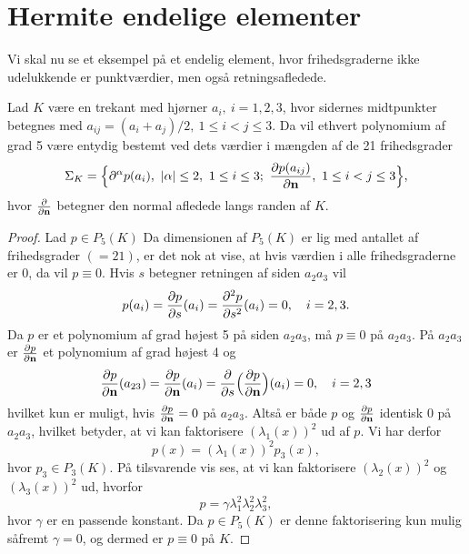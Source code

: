 \section{Hermite endelige elementer}
Vi skal nu se et eksempel på et endelig element, hvor frihedsgraderne
ikke udelukkende er punktværdier, men også retningsafledede.

\begin{theorem} \label{sec:arg} \label{argee}
Lad $K$ være en trekant med hjørner $a_i, \ i=1,2,3$, hvor sidernes 
midtpunkter betegnes med $a_{ij}=(a_i+a_j)/2, \ 1\leq i<j\leq 3$.
Da vil ethvert polynomium af grad 5 være entydig bestemt ved dets 
værdier i mængden af de 21 frihedsgrader 
\begin{equation} 
\Sigma_K = \Bigl\{ \partial^{\alpha}p(a_i), \ |\alpha| \leq 2, \ 1\leq i\leq 3; \ 
\afl{p(a_{ij})}{\n} ,\ 1\leq i<j\leq 3 \Bigr\}, 
\end{equation}
hvor $\frac{\partial }{\partial \mathbf{n}}$ betegner den normal afledede langs randen af $K$. 
\end{theorem}
\begin{proof}
Lad $p\in P_5(K)$
Da dimensionen af $P_5(K)$ er lig med antallet af frihedsgrader $(=21)$, er 
det nok at vise, at hvis værdien i alle frihedsgraderne er 0, da vil
$p\equiv 0$. Hvis $s$ betegner retningen af siden $a_2a_3$ vil
\begin{equation} \label{sec:arg1}
  p(a_i) = \frac{\partial p}{\partial s}(a_i) = \frac{\partial^2 p}{\partial s^2}(a_i)
  =0, \quad i=2,3. 
\end{equation}
Da $p$ er et polynomium af grad højest 5 på siden $a_2a_3$, må
$p\equiv 0$ på
$a_2a_3$. På $a_2a_3$ er $\frac{\partial p}{\partial \mathbf{n}}$ et polynomium af grad højest 4 og
\begin{equation} \label{sec:arg2}
  \frac{\partial p}{\partial \mathbf{n}}(a_{23})=\frac{\partial p}{\partial \mathbf{n}}(a_i)=
  \frac{\partial}{\partial s}\Bigl(\frac{\partial p}{\partial \mathbf{n}}\Bigr)(a_i)=0, \quad i=2,3 
\end{equation}
hvilket kun er muligt, hvis $\frac{\partial p}{\partial \mathbf{n}}=0$ på $a_2a_3$. Altså er både
$p$ og $\frac{\partial p}{\partial \mathbf{n}}$ identisk 0 på $a_2a_3$, hvilket betyder, at vi kan
faktorisere $(\lambda_1(x))^2$ ud af $p$. Vi har derfor
\begin{equation} 
  p(x)=(\lambda_1(x))^2 p_3(x), 
\end{equation}
hvor $p_3\in P_3(K)$. På tilsvarende vis ses, at vi kan faktorisere 
$(\lambda_2(x))^2$ og $(\lambda_3(x))^2$ ud, hvorfor
\begin{equation} 
  p=\gamma \lambda_1^2 \lambda_2^2 \lambda_3^2 , 
\end{equation}
hvor $\gamma$ er en passende konstant. Da $p\in P_5(K)$ er denne 
faktorisering kun mulig såfremt $\gamma =0$, og dermed er $p\equiv 0$ på $K$. 
\end{proof}


